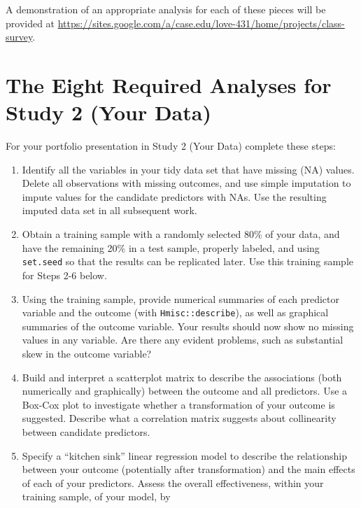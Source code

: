 \documentclass[]{book}
\providecommand{\tightlist}{%
  \setlength{\itemsep}{0pt}\setlength{\parskip}{0pt}}
\theoremstyle{definition}
\theoremstyle{definition}
\theoremstyle{definition}
\theoremstyle{remark}
\begin{document}
A demonstration of an appropriate analysis for each of these pieces will
be provided at
\url{https://sites.google.com/a/case.edu/love-431/home/projects/class-survey}.

\newpage

\hypertarget{the-eight-required-analyses-for-study-2-your-data}{%
\section{The Eight Required Analyses for Study 2 (Your
Data)}\label{the-eight-required-analyses-for-study-2-your-data}}

For your portfolio presentation in Study 2 (Your Data) complete these
steps:

\begin{enumerate}
\def\labelenumi{\arabic{enumi}.}
\setcounter{enumi}{-1}
\tightlist
\item
  Identify all the variables in your tidy data set that have missing
  (NA) values. Delete all observations with missing outcomes, and use
  simple imputation to impute values for the candidate predictors with
  NAs. Use the resulting imputed data set in all subsequent work.
\item
  Obtain a training sample with a randomly selected 80\% of your data,
  and have the remaining 20\% in a test sample, properly labeled, and
  using \texttt{set.seed} so that the results can be replicated later.
  Use this training sample for Steps 2-6 below.
\item
  Using the training sample, provide numerical summaries of each
  predictor variable and the outcome (with \texttt{Hmisc::describe}), as
  well as graphical summaries of the outcome variable. Your results
  should now show no missing values in any variable. Are there any
  evident problems, such as substantial skew in the outcome variable?
\item
  Build and interpret a scatterplot matrix to describe the associations
  (both numerically and graphically) between the outcome and all
  predictors. Use a Box-Cox plot to investigate whether a transformation
  of your outcome is suggested. Describe what a correlation matrix
  suggests about collinearity between candidate predictors.
\item
  Specify a ``kitchen sink'' linear regression model to describe the
  relationship between your outcome (potentially after transformation)
  and the main effects of each of your predictors. Assess the overall
  effectiveness, within your training sample, of your model, by

\end{enumerate}
\end{document}
